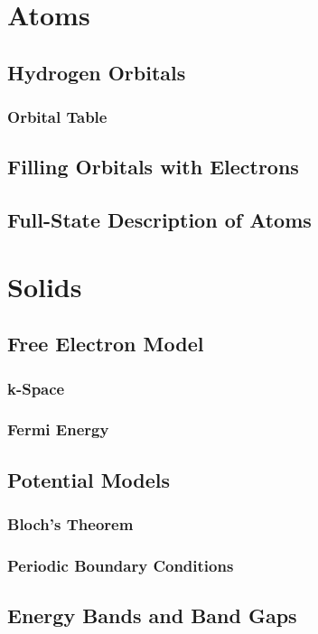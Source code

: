 \section{Atoms}
\subsection{Hydrogen Orbitals}
\subsubsection{Orbital Table}
\subsection{Filling Orbitals with Electrons}
\subsection{Full-State Description of Atoms}

\section{Solids}
\subsection{Free Electron Model}
\subsubsection{k-Space}
\subsubsection{Fermi Energy}
\subsection{Potential Models}
\subsubsection{Bloch's Theorem}
\subsubsection{Periodic Boundary Conditions}
\subsection{Energy Bands and Band Gaps}